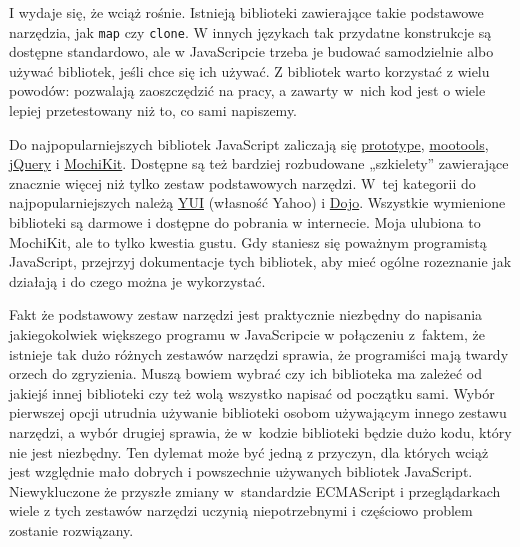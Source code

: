   
I wydaje się, że wciąż rośnie. Istnieją biblioteki zawierające takie podstawowe narzędzia, jak \texttt{map} czy \texttt{clone}. W innych językach tak przydatne konstrukcje są dostępne standardowo, ale w JavaScripcie trzeba je budować samodzielnie albo używać bibliotek, jeśli chce się ich używać. Z bibliotek warto korzystać z wielu powodów: pozwalają zaoszczędzić na pracy, a zawarty w~nich kod jest o wiele lepiej przetestowany niż to, co sami napiszemy.

  
Do najpopularniejszych bibliotek JavaScript zaliczają się \href{http://www.prototypejs.org/}{prototype}, \href{http://mootools.net}{mootools}, \href{http://jquery.com}{jQuery} i \href{http://mochi.github.io/mochikit/}{MochiKit}. Dostępne są też bardziej rozbudowane „szkielety” zawierające znacznie więcej niż tylko zestaw podstawowych narzędzi. W~tej kategorii do najpopularniejszych należą \href{http://yuilibrary.com/}{YUI} (własność Yahoo) i \href{http://dojotoolkit.org/}{Dojo}. Wszystkie wymienione biblioteki są darmowe i dostępne do pobrania w internecie. Moja ulubiona to MochiKit, ale to tylko kwestia gustu. Gdy staniesz się poważnym programistą JavaScript, przejrzyj dokumentacje tych bibliotek, aby mieć ogólne rozeznanie jak działają i do czego można je wykorzystać.

  
Fakt że podstawowy zestaw narzędzi jest praktycznie niezbędny do napisania jakiegokolwiek większego programu w JavaScripcie w połączeniu z~faktem, że istnieje tak dużo różnych zestawów narzędzi sprawia, że programiści mają twardy orzech do zgryzienia. Muszą bowiem wybrać czy ich biblioteka ma zależeć od jakiejś innej biblioteki czy też wolą wszystko napisać od początku sami. Wybór pierwszej opcji utrudnia używanie biblioteki osobom używającym innego zestawu narzędzi, a wybór drugiej sprawia, że w~kodzie biblioteki będzie dużo kodu, który nie jest niezbędny. Ten dylemat może być jedną z przyczyn, dla których wciąż jest względnie mało dobrych i powszechnie używanych bibliotek JavaScript. Niewykluczone że przyszłe zmiany w~standardzie ECMAScript i przeglądarkach wiele z tych zestawów narzędzi uczynią niepotrzebnymi i częściowo problem zostanie rozwiązany.